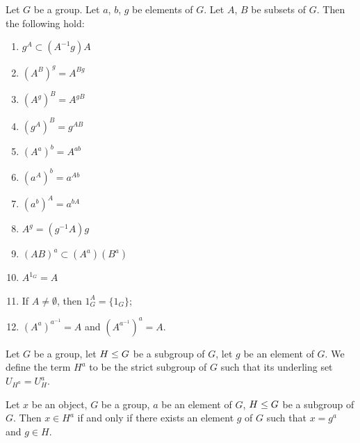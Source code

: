 \begin{theorem}
Let $G$ be a group. Let $a$, $b$, $g$ be elements of $G$.
Let $A$, $B$ be subsets of $G$. Then the following hold:
\begin{enumerate}
\item{} $g^{A}\subset(A^{-1}g)A$
\item{} $(A^{B})^{g}=A^{Bg}$
\item{} $(A^{g})^{B}=A^{gB}$
\item{} $(g^{A})^{B}=g^{AB}$
\item{} $(A^{a})^{b}=A^{ab}$
\item{} $(a^{A})^{b}=a^{Ab}$
\item{} $(a^{b})^{A}=a^{bA}$
\item{} $A^{g}=(g^{-1}A)g$
\item{} $(AB)^{a}\subset (A^{a})(B^{a})$
\item{} $A^{1_{G}}=A$
\item{} If $A\neq\emptyset$, then $1_{G}^{A}=\{1_{G}\}$;
\item{} $(A^{a})^{a^{-1}}=A$ and $(A^{a^{-1}})^{a}=A$.
\end{enumerate}
\end{theorem}

\begin{definition}
Let $G$ be a group, let $H\leq G$ be a subgroup of $G$, let $g$
be an element of $G$.
We define the term $H^{a}$ to be the strict subgroup of $G$ such that
its underling set $U_{H^{a}}=U_{H}^{a}$.
\end{definition}

\begin{theorem}
Let $x$ be an object, $G$ be a group, $a$ be an element of $G$,
$H\leq G$ be a subgroup of $G$. Then $x\in H^{a}$ if and only if
there exists an element $g$ of $G$ such that $x=g^{a}$ and $g\in H$.
\end{theorem}

